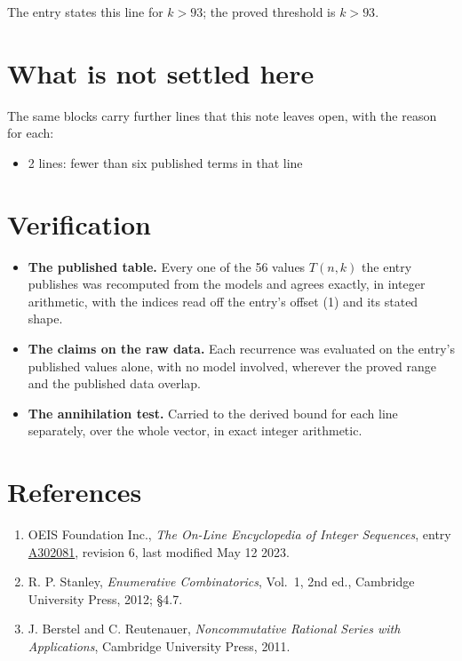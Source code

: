 \documentclass[11pt]{article}
\theoremstyle{definition}
\begin{document}
The entry states this line for $k > 93$; the proved threshold is $k > 93$.

\section{What is not settled here}

The same blocks carry further lines that this note leaves open, with the reason for each:

\begin{itemize}

\item 2 lines: fewer than six published terms in that line

\end{itemize}

\section{Verification}

\begin{itemize}

\item {\bfseries The published table.} Every one of the 56 values $T(n,k)$ the entry publishes was recomputed from the models and agrees exactly, in integer arithmetic, with the indices read off the entry's offset (1) and its stated shape.

\item {\bfseries The claims on the raw data.} Each recurrence was evaluated on the entry's published values alone, with no model involved, wherever the proved range and the published data overlap.

\item {\bfseries The annihilation test.} Carried to the derived bound for each line separately, over the whole vector, in exact integer arithmetic.

\end{itemize}

\section{References}

\begin{enumerate}

\item OEIS Foundation Inc., \emph{The On-Line Encyclopedia of Integer Sequences}, entry \href{https://oeis.org/A302081}{A302081}, revision 6, last modified May 12 2023.

\item R. P. Stanley, \emph{Enumerative Combinatorics}, Vol.~1, 2nd ed., Cambridge University Press, 2012; \S4.7.

\item J. Berstel and C. Reutenauer, \emph{Noncommutative Rational Series with Applications}, Cambridge University Press, 2011.

\end{enumerate}
\end{document}
